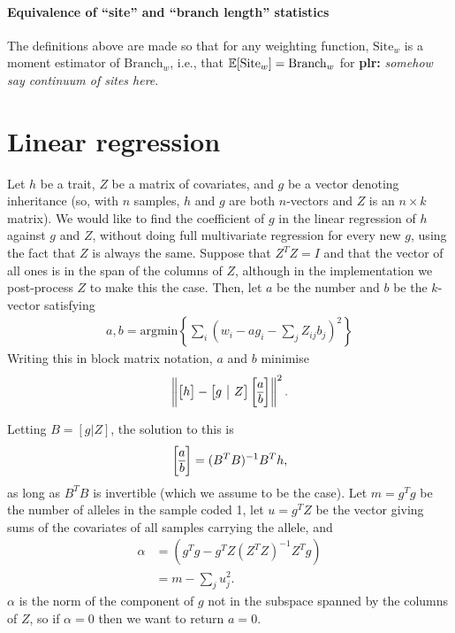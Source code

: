 \documentclass{article}
\newcommand{\branch}{\mbox{Branch}} %
\newcommand{\site}{\mbox{Site}} %
\newcommand{\plr}[1]{{\color{blue}\textbf{plr:} \it #1}}
\begin{document}
\paragraph{Equivalence of ``site'' and ``branch length'' statistics}
The definitions above are made so that for any weighting function,
$\site_w$ is a moment estimator of $\branch_w$, i.e.,
that $\E[\site_w] = \branch_w$ for \plr{somehow say continuum of sites here}.

\appendix

\section{Linear regression}

Let $h$ be a trait, $Z$ be a matrix of covariates, and $g$ be a vector denoting inheritance
(so, with $n$ samples, $h$ and $g$ are both $n$-vectors and $Z$ is an $n \times k$ matrix).
We would like to find the coefficient of $g$ in the linear regression of $h$ against $g$ and $Z$,
without doing full multivariate regression for every new $g$,
using the fact that $Z$ is always the same.
Suppose that $Z^T Z = I$ and that the vector of all ones is in the span of the columns of $Z$,
although in the implementation we post-process $Z$ to make this the case.
Then, let $a$ be the number and $b$ be the $k$-vector satisfying
\begin{align*}
    a, b = \text{argmin}\left\{ \sum_i \left( w_i - a g_i - \sum_j Z_{ij} b_j \right)^2 \right\}
\end{align*}
Writing this in block matrix notation, $a$ and $b$ minimise
\begin{align*}
    \left\| 
        \left[ \begin{array}{@{}c@{}} h \end{array}\right]
            - 
        \left[ \begin{array}{@{}c|c@{}} g & Z \end{array} \right]
            \left[ \begin{array}{@{}c@{}} a \\ \hline b \end{array} \right]
    \right\|^2 .
\end{align*}


Letting $B = [g | Z]$, the solution to this is
\begin{align*}
    \left[\begin{array}{@{}c@{}}a\\\hline b\end{array}\right] 
        = (B^T B)^{-1} B^T h ,
\end{align*}
as long as $B^T B$ is invertible (which we assume to be the case).
Let $m = g^T g$ be the number of alleles in the sample coded 1,
let $u = g^T Z$ be the vector giving sums of the covariates of all samples carrying the allele,
and
\begin{align*}
    \alpha
    &=
        (g^T g - g^T Z (Z^T Z)^{-1} Z^T g) \\
    &=
        m - \sum_j u_j^2 .
\end{align*}
$\alpha$ is the norm of the component of $g$ not in the subspace spanned by the columns of $Z$,
so if $\alpha = 0$ then we want to return $a=0$.
\end{document}
